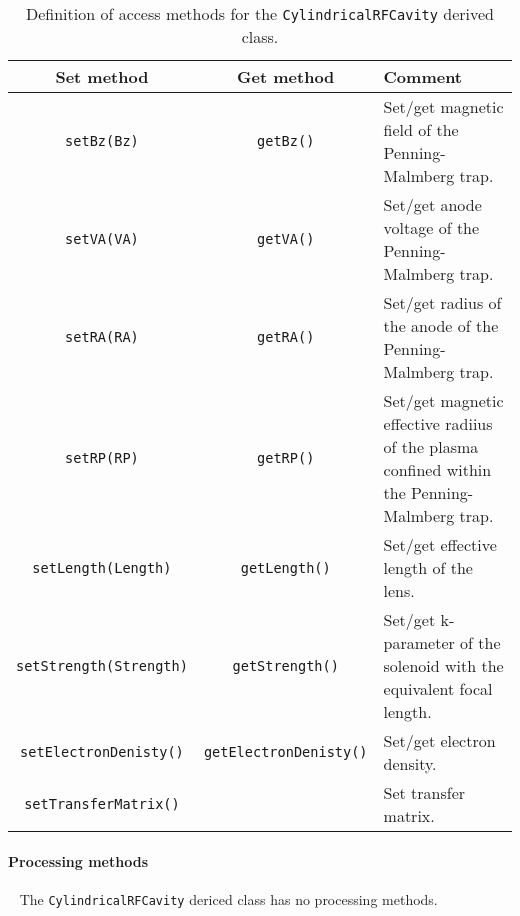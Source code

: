 \begin{table}[h]
  \caption{
    Definition of access methods for the \texttt{CylindricalRFCavity} derived
    class. 
  }
  \label{Tab:CylndclRFCvty:Methods}
  \begin{center}
    \begin{tabular}{|c|c|p{7cm}|}
      \hline
      \textbf{Set method} & \textbf{Get method}  & \textbf{Comment}                                                 \\
      \hline
      \texttt{setBz(Bz)}         & \texttt{getBz()}     & Set/get magnetic field of the Penning-Malmberg trap.      \\
      \texttt{setVA(VA)}         & \texttt{getVA()}     & Set/get anode voltage of the Penning-Malmberg trap.       \\
      \texttt{setRA(RA)}         & \texttt{getRA()}     & Set/get radius of the anode of the Penning-Malmberg trap. \\
      \texttt{setRP(RP)}         & \texttt{getRP()}     & Set/get magnetic effective radiius of the plasma confined 
                                                          within the Penning-Malmberg trap.                         \\
      \texttt{setLength(Length)} & \texttt{getLength()} & Set/get effective length of the lens.                     \\

      \texttt{setStrength(Strength)} & \texttt{getStrength()} & Set/get k-parameter of the solenoid with the
                                                                equivalent focal length.                            \\
      \texttt{setElectronDenisty()} & \texttt{getElectronDenisty()} & Set/get electron density.                     \\
      \texttt{setTransferMatrix()} &                    & Set transfer matrix.                                      \\
      \hline
    \end{tabular}
  \end{center}
\end{table}

\paragraph{Processing methods} ~\newline
\noindent
The \texttt{CylindricalRFCavity} dericed class has no processing methods.

